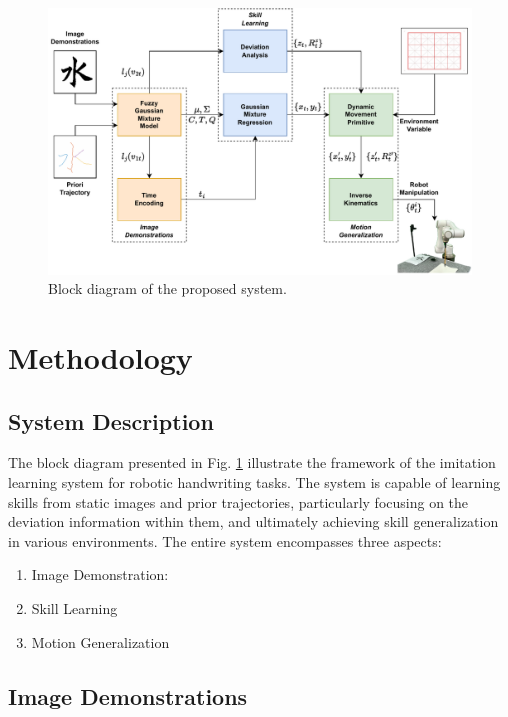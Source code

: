 \documentclass[journal]{IEEEtran}
\begin{document}
\begin{figure}[!t]
    \centering
    \includegraphics[width=6in]{./fig/fig1.pdf}
    \caption{Block diagram of the proposed system.}
    \label{fig1}
\end{figure}

\section{Methodology}
\subsection{System Description}
The block diagram presented in Fig. \ref{fig1} illustrate the framework of the imitation learning system for robotic handwriting tasks. The system is capable of learning skills from static images and prior trajectories, particularly focusing on the deviation information within them, and ultimately achieving skill generalization in various environments. The entire system encompasses three aspects:






\begin{enumerate}
    \item Image Demonstration: 
    \item Skill Learning
    \item Motion Generalization
    
\end{enumerate}

\subsection{Image Demonstrations}
\end{document}
